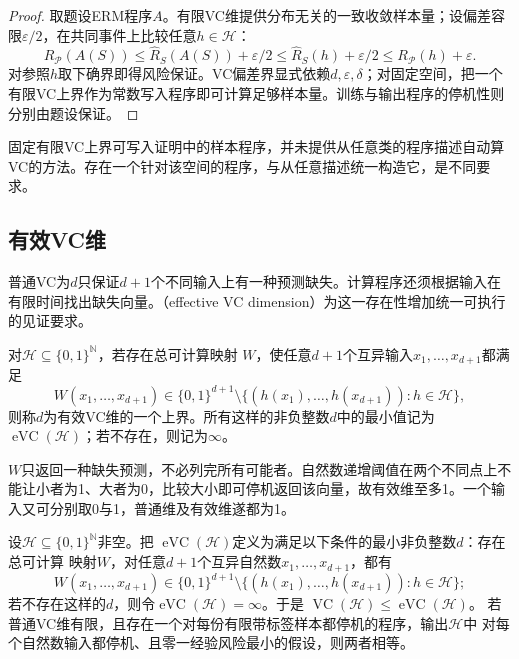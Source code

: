 \begin{proof}
取题设ERM程序$A$。有限VC维提供分布无关的一致收敛样本量；设偏差容限$\varepsilon/2$，在共同事件上比较任意$h\in\mathcal H$：
\[
 R_{\mathcal P}(A(S))
 \leq\hat R_S(A(S))+\varepsilon/2
 \leq\hat R_S(h)+\varepsilon/2
 \leq R_{\mathcal P}(h)+\varepsilon.
\]
对参照$h$取下确界即得风险保证。VC偏差界显式依赖$d,\varepsilon,\delta$；对固定空间，把一个有限VC上界作为常数写入程序即可计算足够样本量。训练与输出程序的停机性则分别由题设保证。
\end{proof}

固定有限VC上界可写入证明中的样本程序，并未提供从任意类的程序描述自动算VC的方法。存在一个针对该空间的程序，与从任意描述统一构造它，是不同要求。

\subsection{有效VC维}

普通VC为$d$只保证$d+1$个不同输入上有一种预测缺失。计算程序还须根据输入在有限时间找出缺失向量。（effective VC dimension）为这一存在性增加统一可执行的见证要求。

\begin{definition}[有效VC维]
\label{def:effective-vc-dimension}
对$\mathcal H\subseteq\{0,1\}^{\mathbb N}$，若存在总可计算映射
$W$，使任意$d+1$个互异输入$x_1,\ldots,x_{d+1}$都满足
\[
 W(x_1,\ldots,x_{d+1})\in\{0,1\}^{d+1}
 \setminus\{(h(x_1),\ldots,h(x_{d+1})):h\in\mathcal H\},
\]
则称$d$为有效VC维的一个上界。所有这样的非负整数$d$中的最小值记为
$\operatorname{eVC}(\mathcal H)$；若不存在，则记为$\infty$。
\end{definition}

$W$只返回一种缺失预测，不必列完所有可能者。自然数递增阈值在两个不同点上不能让小者为1、大者为0，比较大小即可停机返回该向量，故有效维至多1。一个输入又可分别取0与1，普通维及有效维遂都为1。

\begin{theorem}[普通VC维与有效VC维的比较]
\label{thm:effective-vc-comparison}
设$\mathcal H\subseteq\{0,1\}^{\mathbb N}$非空。把
$\operatorname{eVC}(\mathcal H)$定义为满足以下条件的最小非负整数$d$：存在总可计算
映射$W$，对任意$d+1$个互异自然数$x_1,\ldots,x_{d+1}$，都有
\[
 W(x_1,\ldots,x_{d+1})\in\{0,1\}^{d+1}
 \setminus\{(h(x_1),\ldots,h(x_{d+1})):h\in\mathcal H\};
\]
若不存在这样的$d$，则令$\operatorname{eVC}(\mathcal H)=\infty$。于是
$\operatorname{VC}(\mathcal H)\leq\operatorname{eVC}(\mathcal H)$。
若普通VC维有限，且存在一个对每份有限带标签样本都停机的程序，输出$\mathcal H$中
对每个自然数输入都停机、且零一经验风险最小的假设，则两者相等。
\end{theorem}

